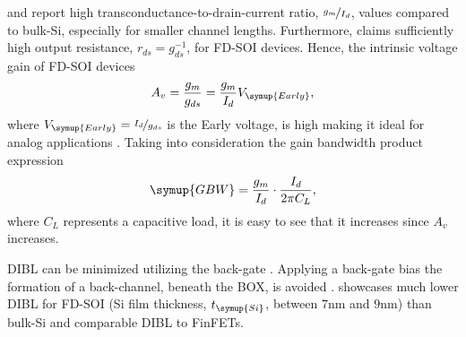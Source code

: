 		\cite{nazarov_functional_2014} and \cite{FDSOICMOS} report high transconductance-to-drain-current ratio, $\nicefrac{g_m}{I_d}$, values compared to bulk-Si, especially for smaller channel lengths. Furthermore, \cite{FDSOICMOS} claims sufficiently high output resistance, $r_{ds}=g_{ds}^{-1}$, for FD-SOI devices. Hence, the intrinsic voltage gain of FD-SOI devices $$A_v=\frac{g_m}{g_{ds}}=\frac{g_m}{I_d}V_{\symup{Early}},$$ where $V_{\symup{Early}}=\nicefrac{I_d}{g_{ds}}$ is the Early voltage, is high making it ideal for analog applications \cite{nazarov_functional_2014}. Taking into consideration the gain bandwidth product expression $$\symup{GBW}=\frac{g_m}{I_d}\cdot\frac{I_d}{2\pi C_L},$$ where $C_L$ represents a capacitive load, it is easy to see that it increases since $A_v$ increases.\par

		DIBL can be minimized utilizing the back-gate \cite{FDSOICMOS}. Applying a back-gate bias the formation of a back-channel, beneath the BOX, is avoided \cite{FDSOICMOS}. \cite{5703287} showcases much lower DIBL for FD-SOI (Si film thickness, $t_{\symup{Si}}$, between $7\unit{\nano\meter}$ and $9\unit{\nano\meter}$) than bulk-Si and comparable DIBL to FinFETs.

	

	
